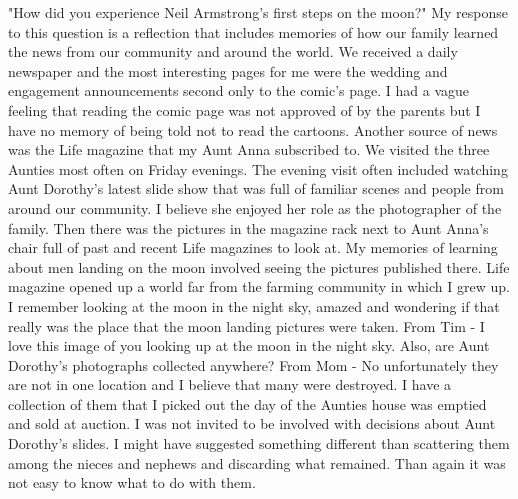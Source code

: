 "How did you experience Neil Armstrong's first steps on the moon?"
My response to this question is a reflection that includes memories of how our family learned the news from our community and around the world. We received a daily newspaper and the most interesting pages for me were the wedding and engagement announcements second only to the comic's page. I had a vague feeling that reading the comic page was not approved of by the parents but I have no memory of being told not to read the cartoons.
Another source of news was the Life magazine that my Aunt Anna subscribed to. We visited the three Aunties most often on Friday evenings. The evening visit often included watching Aunt Dorothy's latest slide show that was full of familiar scenes and people from around our community. I believe she enjoyed her role as the photographer of the family. Then there was the pictures in the magazine rack next to Aunt Anna's chair full of past and recent Life magazines to look at. My memories of learning about men landing on the moon involved seeing the pictures published there. Life magazine opened up a world far from the farming community in which I grew up. I remember looking at the moon in the night sky, amazed and wondering if that really was the place that the moon landing pictures were taken.
From Tim - I love this image of you looking up at the moon in the night sky. Also, are Aunt Dorothy's photographs collected anywhere?
From Mom - No unfortunately they are not in one location and I believe that many were destroyed. I have a collection of them that I picked out the day of the Aunties house was emptied and sold at auction. I was not invited to be involved with decisions about Aunt Dorothy's slides. I might have suggested something different than scattering them among the nieces and nephews and discarding what remained. Than again it was not easy to know what to do with them.





